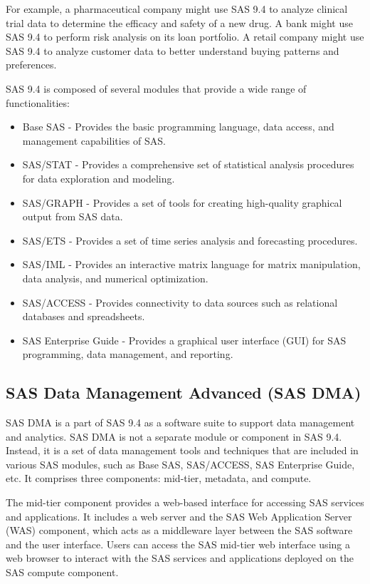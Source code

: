 For example, a pharmaceutical company might use SAS 9.4 to analyze clinical trial data to determine the efficacy and safety of a new drug. A bank might use SAS 9.4 to perform risk analysis on its loan portfolio. A retail company might use SAS 9.4 to analyze customer data to better understand buying patterns and preferences.

SAS 9.4 is composed of several modules that provide a wide range of functionalities:
\begin{itemize}
    \item Base SAS - Provides the basic programming language, data access, and management capabilities of SAS.
    \item SAS/STAT - Provides a comprehensive set of statistical analysis procedures for data exploration and modeling.
    \item SAS/GRAPH - Provides a set of tools for creating high-quality graphical output from SAS data.
    \item SAS/ETS - Provides a set of time series analysis and forecasting procedures.
    \item SAS/IML - Provides an interactive matrix language for matrix manipulation, data analysis, and numerical optimization.
    \item SAS/ACCESS - Provides connectivity to data sources such as relational databases and spreadsheets.
    \item SAS Enterprise Guide - Provides a graphical user interface (GUI) for SAS programming, data management, and reporting.
\end{itemize}

\subsection{SAS Data Management Advanced (SAS DMA)}
SAS DMA is a part of SAS 9.4 as a software suite to support data management and analytics. SAS DMA is not a separate module or component in SAS 9.4. Instead, it is a set of data management tools and techniques that are included in various SAS modules, such as Base SAS, SAS/ACCESS, SAS Enterprise Guide, etc. It comprises three components: mid-tier, metadata, and compute.

The mid-tier component provides a web-based interface for accessing SAS services and applications. It includes a web server and the SAS Web Application Server (WAS) component, which acts as a middleware layer between the SAS software and the user interface. Users can access the SAS mid-tier web interface using a web browser to interact with the SAS services and applications deployed on the SAS compute component.

